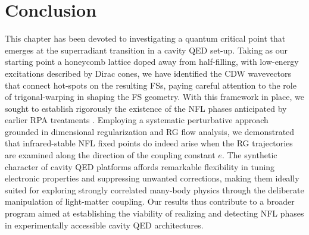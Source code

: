 \section{Conclusion}
\label{secsum}

This chapter has been devoted to investigating a quantum critical point 
that emerges at the superradiant transition in a cavity QED set-up. 
Taking as our starting point a honeycomb lattice doped away from 
half-filling, with low-energy excitations described by Dirac cones, we 
have identified the CDW wavevectors that connect hot-spots on the 
resulting FSs, paying careful attention to the role of trigonal-warping 
in shaping the FS geometry. With this framework in place, we sought to 
establish rigorously the existence of the NFL phases anticipated by 
earlier RPA treatments \cite{peng}. Employing a systematic perturbative 
approach grounded in dimensional regularization and RG flow analysis, 
we demonstrated that infrared-stable NFL fixed points do indeed arise 
when the RG trajectories are examined along the direction of the coupling 
constant $e$. The synthetic character of cavity QED platforms affords 
remarkable flexibility in tuning electronic properties and suppressing 
unwanted corrections, making them ideally suited for exploring strongly 
correlated many-body physics through the deliberate manipulation of 
light-matter coupling. Our results thus contribute to a broader program 
aimed at establishing the viability of realizing and detecting NFL 
phases in experimentally accessible cavity QED architectures.

%
%

